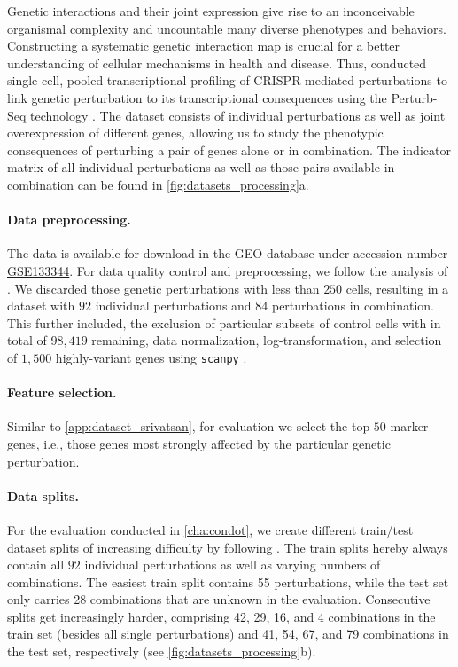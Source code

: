  Genetic interactions and their joint expression give rise to an inconceivable organismal complexity and uncountable many diverse phenotypes and behaviors.
Constructing a systematic genetic interaction map is crucial for a better understanding of cellular mechanisms in health and disease.
Thus, \citet{norman2019exploring} conducted single-cell, pooled transcriptional profiling of CRISPR-mediated perturbations to link genetic perturbation to its transcriptional consequences using the Perturb-Seq technology \citep{dixit2016perturb, adamson2016multiplexed}.
The dataset consists of individual perturbations as well as joint overexpression of different genes, allowing us to study the phenotypic consequences of perturbing a pair of genes alone or in combination. The indicator matrix of all individual perturbations as well as those pairs available in combination can be found in \cref{fig:datasets_processing}a.

\paragraph{Data preprocessing.}
 The data is available for download in the \acrshort{GEO} database under accession number \href{https://www.ncbi.nlm.nih.gov/geo/query/acc.cgi?acc=GSE133344}{GSE133344}.
For data quality control and preprocessing, we follow the analysis of \citet{lotfollahi2021compositional}.
We discarded those genetic perturbations with less than $250$ cells, resulting in a dataset with $92$ individual perturbations and $84$ perturbations in combination.
This further included, the exclusion of particular subsets of control cells with in total of $98,419$ remaining, data normalization, log-transformation, and selection of $1,500$ highly-variant genes using \texttt{scanpy} \citep{wolf2018scanpy}.

\paragraph{Feature selection.}
Similar to \cref{app:dataset_srivatsan}, for evaluation we select the top $50$ marker genes, i.e., those genes most strongly affected by the particular genetic perturbation.

\paragraph{Data splits.} \label{app:datasplits}
For the evaluation conducted in \cref{cha:condot}, we create different train/test dataset splits of increasing difficulty by following \citet{lotfollahi2021compositional}.
The train splits hereby always contain all $92$ individual perturbations as well as varying numbers of combinations. The easiest train split contains 55 perturbations, while the test set only carries 28 combinations that are unknown in the evaluation. Consecutive splits get increasingly harder, comprising 42, 29, 16, and 4 combinations in the train set (besides all single perturbations) and 41, 54, 67, and 79 combinations in the test set, respectively (see \cref{fig:datasets_processing}b).

